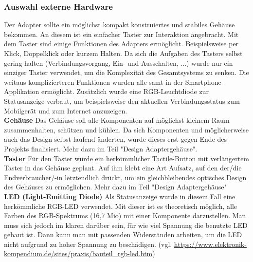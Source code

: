 \documentclass[11pt, twoside]{article}
\begin{document}
\subsubsection{Auswahl externe Hardware}
Der Adapter sollte ein möglichst kompakt konstruiertes und stabiles Gehäuse bekommen. An diesem ist ein einfacher Taster zur Interaktion angebracht. Mit dem Taster sind einige Funktionen des Adapters ermöglicht. Beispielsweise per Klick, Doppelklick oder kurzem Halten. Da sich die Aufgaben des Tasters selbst gering halten (Verbindungsvorgang, Ein- und Ausschalten, ...) wurde nur ein einziger Taster verwendet, um die Komplexität des Gesamtsystems zu senken. Die weitaus komplizierteren Funktionen wurden alle samt in der Smartphone-Applikation ermöglicht. Zusätzlich wurde eine RGB-Leuchtdiode zur Statusanzeige verbaut, um beispielsweise den aktuellen Verbindungsstatus zum Mobilgerät und zum Internet anzuzeigen. \newline \\
\textbf{Gehäuse} \newline
Das Gehäuse soll alle Komponenten auf möglichst kleinem Raum zusammenhalten, schützen und kühlen. Da sich Komponenten und möglicherweise auch das Design selbst laufend änderten, wurde dieses erst gegen Ende des Projekts finalisiert. Mehr dazu im Teil "Design Adaptergehäuse". \newline \\
\textbf{Taster} \newline
Für den Taster wurde ein herkömmlicher Tactile-Button mit verlängertem Taster in das Gehäuse geplant. Auf ihm klebt eine Art Aufsatz, auf den der/die Endverbraucher/-in letztendlich drückt, um ein gleichbleibendes optisches Design des Gehäuses zu ermöglichen. Mehr dazu im Teil "Design Adaptergehäuse"\newline \\
\textbf{LED (Light-Emitting Diode)} \newline
Als Statusanzeige wurde in diesem Fall eine herkömmliche RGB-LED verwendet. Mit dieser ist es theoretisch möglich, alle Farben des RGB-Spektrums (16,7 Mio) mit einer Komponente darzustellen.\newline
Man muss sich jedoch im klaren darüber sein, für wie viel Spannung die benutzte LED gebaut ist. Dann kann man mit passenden Widerständen arbeiten, um die LED nicht aufgrund zu hoher Spannung zu beschädigen.
\vspace{4mm} \newline
(vgl. \url{https://www.elektronik-kompendium.de/sites/praxis/bauteil_rgb-led.htm})
\end{document}
